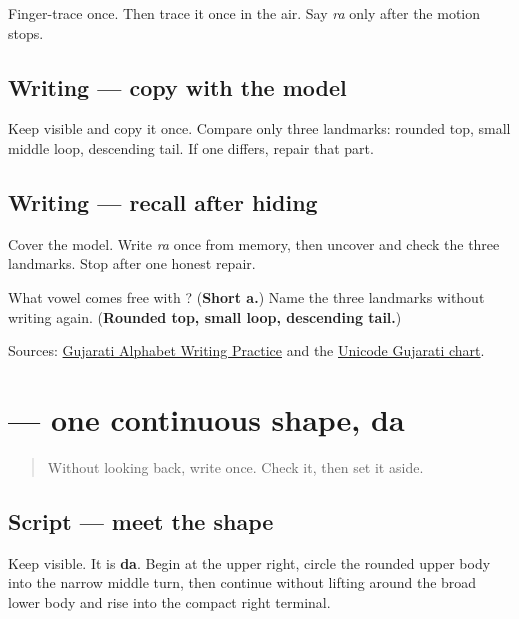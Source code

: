 Finger-trace \textbf{} once. Then trace it once in the air. Say \emph{ra} only after the motion stops.

\subsection*{Writing — copy with the model}
Keep \textbf{} visible and copy it once. Compare only three landmarks: rounded top, small middle loop, descending tail. If one differs, repair that part.

\subsection*{Writing — recall after hiding}
Cover the model. Write \emph{ra} once from memory, then uncover \textbf{} and check the three landmarks. Stop after one honest repair.

\begin{tcolorbox}[breakable,colback=teal!4,colframe=teal!35!black,title={Before you move on}]
What vowel comes free with \textbf{}? (\textbf{Short a.}) Name the three landmarks without writing again. (\textbf{Rounded top, small loop, descending tail.})

Sources: \href{https://www.t30apps.com/gujarati-alphabet-writing/}{Gujarati Alphabet Writing Practice} and the \href{https://www.unicode.org/charts/PDF/U0A80.pdf}{Unicode Gujarati chart}.
\end{tcolorbox}
\section[\texorpdfstring{\gu{દ} (da)}{દ (da)}]{ — one continuous shape, da}

\label{lesson:GU-W02-da}



\begin{quote}
Without looking back, write \textbf{} once. Check it, then set it aside.
\end{quote}

\subsection*{Script — meet the shape}
Keep \textbf{} visible. It is \textbf{da}. Begin at the upper right, circle the rounded upper body into the narrow middle turn, then continue without lifting around the broad lower body and rise into the compact right terminal.

